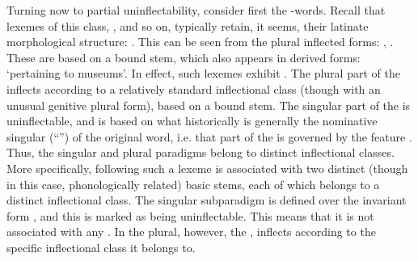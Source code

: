 \documentclass[output=paper,colorlinks,citecolor=brown]{langscibook}
\begin{document}
Turning now  to partial uninflectability, consider first  the  -words.   Recall that lexemes of this class, ,  and so on, typically retain, it seems, their latinate morphological structure: . This can be seen from the plural inflected forms: , . These are  based on a bound stem, \mbox{} \mbox{} which also appears in derived forms:  `pertaining to museums'. In effect, such lexemes  exhibit . The plural part of the  inflects according to a relatively standard inflectional class (though with an unusual genitive plural form), based on a bound stem. The singular part of the  is uninflectable, and is based on what historically is generally the nominative singular (``'') of the original  word, i.e. that part of the  is governed by the feature . Thus, the singular and plural paradigms belong to distinct inflectional classes. More specifically, following \citet[189]{stump2016} such a lexeme is associated with two distinct (though in this case, phonologically related) basic stems, each of which belongs to a distinct inflectional class. The singular subparadigm is defined over the invariant  form , and this  is marked as being uninflectable. This means that it is not associated with any \PF. In the plural, however, the ,  inflects according to the specific inflectional class it belongs to.  
\end{document}
